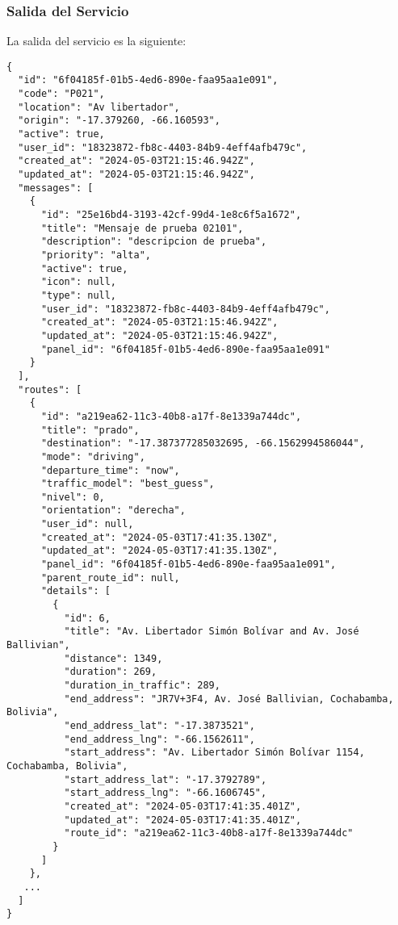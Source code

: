 \documentclass{article}
\begin{document}
\subsubsection{Salida del Servicio}

La salida del servicio es la siguiente:

\begin{verbatim}
{
  "id": "6f04185f-01b5-4ed6-890e-faa95aa1e091",
  "code": "P021",
  "location": "Av libertador",
  "origin": "-17.379260, -66.160593",
  "active": true,
  "user_id": "18323872-fb8c-4403-84b9-4eff4afb479c",
  "created_at": "2024-05-03T21:15:46.942Z",
  "updated_at": "2024-05-03T21:15:46.942Z",
  "messages": [
    {
      "id": "25e16bd4-3193-42cf-99d4-1e8c6f5a1672",
      "title": "Mensaje de prueba 02101",
      "description": "descripcion de prueba",
      "priority": "alta",
      "active": true,
      "icon": null,
      "type": null,
      "user_id": "18323872-fb8c-4403-84b9-4eff4afb479c",
      "created_at": "2024-05-03T21:15:46.942Z",
      "updated_at": "2024-05-03T21:15:46.942Z",
      "panel_id": "6f04185f-01b5-4ed6-890e-faa95aa1e091"
    }
  ],
  "routes": [
    {
      "id": "a219ea62-11c3-40b8-a17f-8e1339a744dc",
      "title": "prado",
      "destination": "-17.387377285032695, -66.1562994586044",
      "mode": "driving",
      "departure_time": "now",
      "traffic_model": "best_guess",
      "nivel": 0,
      "orientation": "derecha",
      "user_id": null,
      "created_at": "2024-05-03T17:41:35.130Z",
      "updated_at": "2024-05-03T17:41:35.130Z",
      "panel_id": "6f04185f-01b5-4ed6-890e-faa95aa1e091",
      "parent_route_id": null,
      "details": [
        {
          "id": 6,
          "title": "Av. Libertador Simón Bolívar and Av. José Ballivian",
          "distance": 1349,
          "duration": 269,
          "duration_in_traffic": 289,
          "end_address": "JR7V+3F4, Av. José Ballivian, Cochabamba, Bolivia",
          "end_address_lat": "-17.3873521",
          "end_address_lng": "-66.1562611",
          "start_address": "Av. Libertador Simón Bolívar 1154, Cochabamba, Bolivia",
          "start_address_lat": "-17.3792789",
          "start_address_lng": "-66.1606745",
          "created_at": "2024-05-03T17:41:35.401Z",
          "updated_at": "2024-05-03T17:41:35.401Z",
          "route_id": "a219ea62-11c3-40b8-a17f-8e1339a744dc"
        }
      ]
    },
   ...
  ]
}
\end{verbatim}
\end{document}
